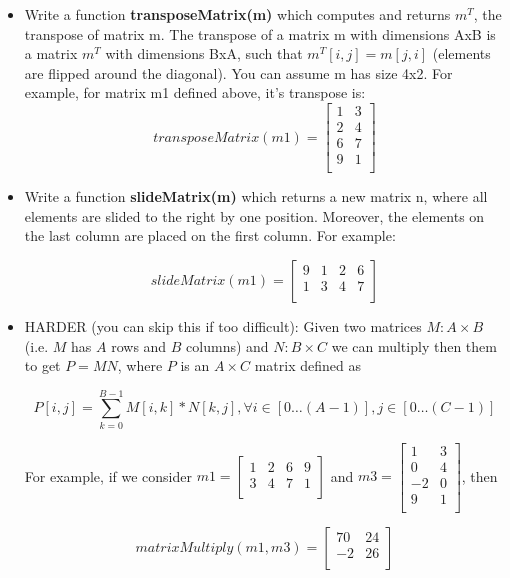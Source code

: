 \documentclass[11pt,a4paper]{report}
\begin{document}
\begin{itemize}
 \item Write a function \textbf{transposeMatrix(m)} which computes and returns $m^T$, the transpose of matrix m.  The transpose of a matrix m with dimensions AxB is a matrix $m^T$ with dimensions BxA, such that $m^T[i,j] = m[j,i]$ (elements are flipped around the diagonal). You can assume m has size 4x2. For example, for matrix m1 defined above, it's transpose is:
    \[ transposeMatrix(m1)= \left[ {\begin{array}{cccc}
   1 & 3\\     
   2 & 4\\
   6 & 7\\
   9 & 1\\
   \end{array} } \right]
\]
 \item Write a function \textbf{slideMatrix(m)} which returns a new matrix n, where all elements are slided to the right by one position. Moreover, the elements on the last column are placed on the first column. For example:
 
    \[ slideMatrix(m1)= \left[ {\begin{array}{cccc}
   9 & 1 & 2 & 6\\     
   1 & 3 & 4 & 7\\
   \end{array} } \right]
\]

 \item HARDER (you can skip this if too difficult): Given two matrices $M:A \times B$ (i.e. $M$ has $A$ rows and $B$ columns) and $N:B \times C$ we can multiply then them to get $P=MN$, where $P$ is an $A \times C$ matrix defined as 
 
 $$P[i,j] = \sum_{k=0}^{B-1} M[i,k] * N[k,j], \forall i \in [0 \dots (A-1)], j \in [0 \dots (C-1)]$$
 
 For example, if we consider $ m1= \left[ {\begin{array}{cccc}
   1 & 2 & 6 & 9\\     
   3 & 4 & 7 & 1\\
   \end{array} } \right]
$ and $m3 = \left[ {\begin{array}{cccc}
   1 & 3\\     
   0 & 4\\
   -2 & 0\\
   9 & 1\\
   \end{array} } \right]$, then 
   
   $$ matrixMultiply(m1, m3) = \left[ {\begin{array}{cccc}
  70 & 24\\
  -2 & 26\\
   \end{array} } \right]$$
 

\end{itemize}
\end{document}
